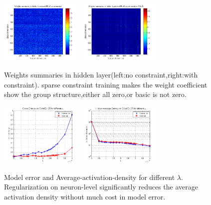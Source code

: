 \begin{figure}
\includegraphics[width=4cm,height=3cm]{figure/Weights_summaries_in_hidden_laye_swell_exp}
\includegraphics[width=4cm,height=3cm]{figure/Weights_summaries_in_hidden_laye_swell_exp_sc_3dot5_e_neg_5}
\caption{Weights summaries in hidden layer(left:no constraint,right:with constraint). sparse constraint
training makes the weight coefficient show the group structure,either all zero,or basic is not zero.}
\end{figure}

\begin{figure}
\includegraphics[width=4cm,height=3cm]{figure/Cross_Entropy_on_SWellEx_S5_for_different_lambda}
\includegraphics[width=4cm,height=3cm]{figure/Hidden_Average_Density_on_SWellEx_S5_for_different_lambda}
\caption{Model error and Average-activation-density for different $\lambda $.  Regularization on neuron-level
significantly reduces the average activation density without much cost in model error.}
\end{figure}


